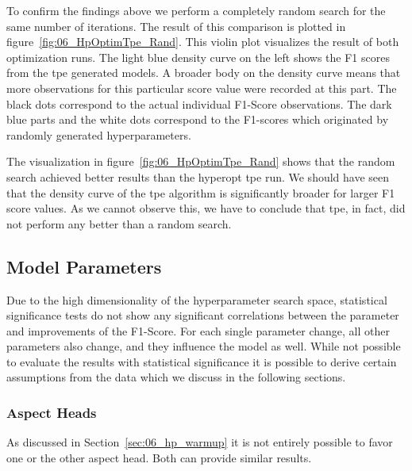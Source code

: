 To confirm the findings above we perform a completely random search for the same number of iterations. The result of this comparison is plotted in figure~\ref{fig:06_HpOptimTpe_Rand}. This violin plot visualizes the result of both optimization runs. The light blue density curve on the left shows the F1 scores from the \gls{tpe} generated models. A broader body on the density curve means that more observations for this particular score value were recorded at this part. The black dots correspond to the actual individual F1-Score observations. The dark blue parts and the white dots correspond to the F1-scores which originated by randomly generated hyperparameters.
\medskip

The visualization in figure~\ref{fig:06_HpOptimTpe_Rand} shows that the random search achieved better results than the hyperopt \gls{tpe} run. We should have seen that the density curve of the \gls{tpe} algorithm is significantly broader for larger F1 score values. As we cannot observe this, we have to conclude that \gls{tpe}, in fact, did not perform any better than a random search.

\subsection{Model Parameters}

Due to the high dimensionality of the hyperparameter search space, statistical significance tests do not show any significant correlations between the parameter and improvements of the F1-Score. For each single parameter change, all other parameters also change, and they influence the model as well. While not possible to evaluate the results with statistical significance it is possible to derive certain assumptions from the data which we discuss in the following sections.

\subsubsection{Aspect Heads}

As discussed in Section~\ref{sec:06_hp_warmup} it is not entirely possible to favor one or the other aspect head. Both can provide similar results. 

